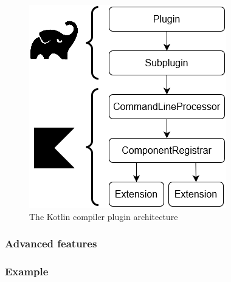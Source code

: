 \begin{figure}[!ht]
    \centering
    \includegraphics[scale=0.8]{document/chapters/2-metaprogramming/images/kotlin_compiler_plugin_architecture.png}
    \caption{The Kotlin compiler plugin architecture \cite{compiler_plugins_jetbrains}}
    \label{fig:kotlin_compiler_plugin_architecture}
\end{figure}

\subsubsection{Advanced features}
\subsubsection{Example}
